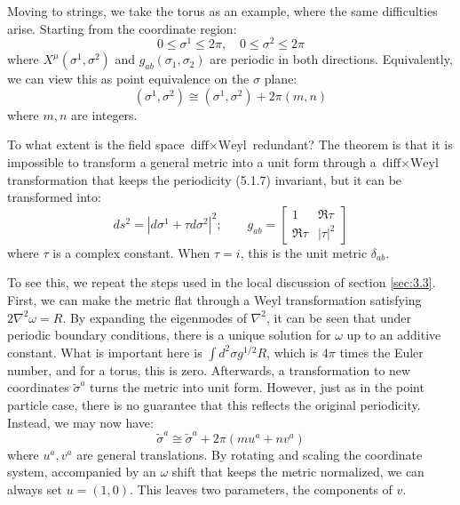 Moving to strings, we take the torus as an example, where the same difficulties arise. Starting from the coordinate region:
\begin{equation}
	0 \leq \sigma^{1} \leq 2 \pi, \quad 0 \leq \sigma^{2} \leq 2 \pi
\end{equation}
where $X^{\mu}\left(\sigma^{1}, \sigma^{2}\right)$ and $g_{a b}\left(\sigma_{1}, \sigma_{2}\right)$ are periodic in both directions. Equivalently, we can view this as point equivalence on the $\sigma$ plane:
\begin{equation}
	\left(\sigma^{1}, \sigma^{2}\right) \cong\left(\sigma^{1}, \sigma^{2}\right)+2 \pi(m, n)\label{5.1.8}
\end{equation}
where $m, n$ are integers.

To what extent is the field space $\text{diff} \times \text{Weyl}$ redundant? The theorem is that it is impossible to transform a general metric into a unit form through a $\text{diff} \times \text{Weyl}$ transformation that keeps the periodicity (5.1.7) invariant, but it can be transformed into:
\begin{equation}
	d s^{2}=\left|d \sigma^{1}+\tau d \sigma^{2}\right|^{2};\qquad g_{ab}=\begin{bmatrix}
		1 & \Re{\tau}\\
		\Re{\tau} & |\tau|^2
	\end{bmatrix}\label{5.1.9}
\end{equation}
where $\tau$ is a complex constant. When $\tau=i$, this is the unit metric $\delta_{a b}$.

To see this, we repeat the steps used in the local discussion of section \ref{sec:3.3}. First, we can make the metric flat through a Weyl transformation satisfying $2 \nabla^{2} \omega=R$. By expanding the eigenmodes of $\nabla^{2}$, it can be seen that under periodic boundary conditions, there is a unique solution for $\omega$ up to an additive constant. What is important here is $\int d^{2} \sigma g^{1 / 2} R$, which is $4 \pi$ times the Euler number, and for a torus, this is zero. Afterwards, a transformation to new coordinates $\tilde{\sigma}^{a}$ turns the metric into unit form. However, just as in the point particle case, there is no guarantee that this reflects the original periodicity. Instead, we may now have:
\begin{equation}
	\tilde{\sigma}^{a} \cong \tilde{\sigma}^{a}+2 \pi\left(m u^{a}+n v^{a}\right)
\end{equation}
where $u^{a}, v^{a}$ are general translations. By rotating and scaling the coordinate system, accompanied by an $\omega$ shift that keeps the metric normalized, we can always set $u=(1,0)$. This leaves two parameters, the components of $v$.

